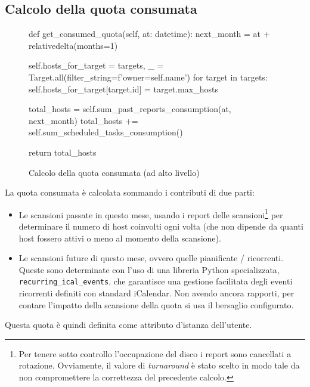 \subsection{Calcolo della quota consumata}

\begin{figure}
\begin{pycode}
def get_consumed_quota(self, at: datetime):
    next_month = at + relativedelta(months=1)

    self.hosts_for_target = {}
    targets, _ = Target.all(filter_string=f'owner={self.name}')
    for target in targets:
        self.hosts_for_target[target.id] = target.max_hosts

    total_hosts = self.sum_past_reports_consumption(at, next_month)
    total_hosts += self.sum_scheduled_tasks_consumption()

    return total_hosts
\end{pycode}
\caption{Calcolo della quota consumata (ad alto livello)}
\end{figure}

La quota consumata è calcolata sommando i contributi di due parti:
\begin{itemize}
    \item Le scansioni passate in questo mese, usando i report delle scansioni\footnote{Per tenere sotto controllo l'occupazione del disco i report sono cancellati a rotazione. Ovviamente, il valore di \emph{turnaround} è stato scelto in modo tale da non compromettere la correttezza del precedente calcolo.} per determinare il numero di host coinvolti ogni volta (che non dipende da quanti host fossero attivi o meno al momento della scansione).
    \item Le scansioni future di questo mese, ovvero quelle pianificate / ricorrenti. Queste sono determinate con l'uso di una libreria Python specializzata, \texttt{recurring\_ical\_events}, che garantisce una gestione facilitata degli eventi ricorrenti definiti con standard iCalendar. Non avendo ancora rapporti, per contare l'impatto della scansione della quota si usa il bersaglio configurato.
\end{itemize}
Questa quota è quindi definita come attributo d'istanza dell'utente.

